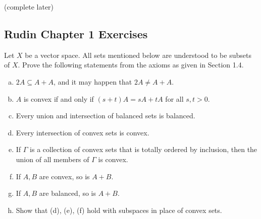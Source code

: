 \begin{example}
	(complete later)
\end{example}

\subsection{Rudin Chapter 1 Exercises}

\begin{exercise}
	Let $X$ be a vector space. All sets mentioned below are understood to be subsets of $X$. Prove the following statements from the axioms as given in Section 1.4.
	\begin{enumerate}[(a)]
		\item $2A \subseteq A+A$, and it may happen that $2A \ne A+A$.
		\item $A$ is convex if and only if $(s+t)A = sA + tA$ for all $s,t>0$.
		\item Every union and intersection of balanced sets is balanced.
		\item Every intersection of convex sets is convex.
		\item If $\Gamma$ is a collection of convex sets that is totally ordered by inclusion, then the union of all members of $\Gamma$ is convex.
		\item If $A, B$ are convex, so is $A+B$.
		\item If $A, B$ are balanced, so is $A+B$.
		\item Show that (d), (e), (f) hold with subspaces in place of convex sets.
	\end{enumerate}
\end{exercise}

